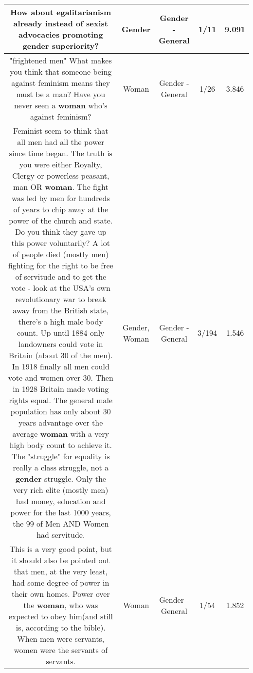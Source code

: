 \documentclass[11pt]{article}
\newlength\mylength
\begin{document}
\begin{center}
\begin{longtable}{|C{.65\mylength}|C{.30\mylength}|C{.12\mylength}|C{.12\mylength}|C{.12\mylength}|}
  \small How about egalitarianism already instead of sexist advocacies promoting \textbf{gender} superiority?\normalsize   & Gender & Gender - General & 1/11 & 9.091 \\  \hline
  \small "frightened men" What makes you think that someone being against feminism means they must be a man? Have you never seen a \textbf{woman} who's against feminism?\normalsize   & Woman & Gender - General & 1/26 & 3.846 \\  \hline
  \small Feminist seem to think that all men had all the power since time began. The truth is you were either Royalty, Clergy or powerless peasant, man OR \textbf{woman}. The fight was led by men for hundreds of years to chip away at the power of the church and state. Do you think they gave up this power voluntarily? A lot of people died (mostly men) fighting for the right to be free of servitude and to get the vote - look at the USA's own revolutionary war to break away from the British state, there's a high male body count. Up until 1884 only landowners could vote in Britain (about 30 of the men). In 1918 finally all men could vote and women over 30. Then in 1928 Britain made voting rights equal. The general male population has only about 30 years advantage over the average \textbf{woman} with a very high body count to achieve it. The "struggle" for equality is really a class struggle, not a \textbf{gender} struggle. Only the very rich elite (mostly men) had money, education and power for the last 1000 years, the 99 of Men AND Women had servitude.\normalsize   & Gender, Woman & Gender - General & 3/194 & 1.546 \\  \hline
  \small This is a very good point, but it should also be pointed out that men, at the very least, had some degree of power in their own homes. Power over the \textbf{woman}, who was expected to obey him(and still is, according to the bible). When men were servants, women were the servants of servants.\normalsize   & Woman & Gender - General & 1/54 & 1.852 \\  \hline

\end{longtable}
\end{center}
\end{document}
